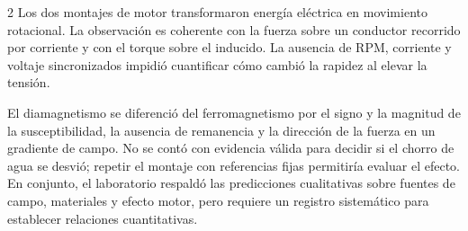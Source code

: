 \documentclass[10pt,letterpaper]{article}
\begin{document}
\begin{multicols}{2}
Los dos montajes de motor transformaron energía eléctrica en movimiento rotacional. La observación es coherente con la fuerza sobre un conductor recorrido por corriente y con el torque sobre el inducido. La ausencia de RPM, corriente y voltaje sincronizados impidió cuantificar cómo cambió la rapidez al elevar la tensión.

El diamagnetismo se diferenció del ferromagnetismo por el signo y la magnitud de la susceptibilidad, la ausencia de remanencia y la dirección de la fuerza en un gradiente de campo. No se contó con evidencia válida para decidir si el chorro de agua se desvió; repetir el montaje con referencias fijas permitiría evaluar el efecto. En conjunto, el laboratorio respaldó las predicciones cualitativas sobre fuentes de campo, materiales y efecto motor, pero requiere un registro sistemático para establecer relaciones cuantitativas.

\end{multicols}



\end{document}
